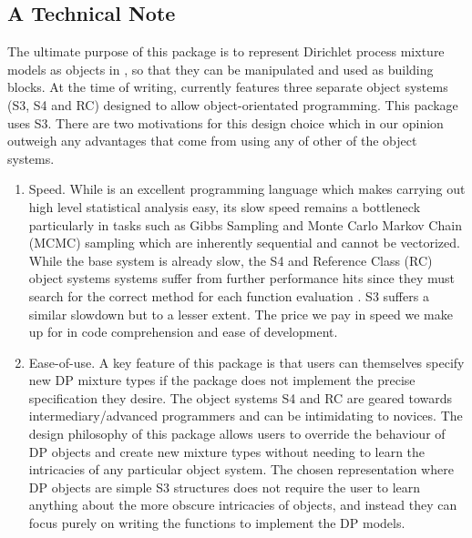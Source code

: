 \documentclass[nojss]{jss}
\begin{document}
\subsection{A Technical Note}
The ultimate purpose of this package is to represent Dirichlet process mixture models as objects in , so that they can be manipulated and used as building blocks. At the time of writing,  currently features three separate object systems (S3, S4 and RC) designed to allow object-orientated programming. This package uses S3. There are two motivations for this design choice which in our opinion outweigh any advantages that come from using any of other of the  object systems.

\begin{enumerate}
\item Speed. While  is an excellent programming language which makes carrying out high level statistical analysis easy, its slow speed remains a bottleneck particularly in tasks such as Gibbs Sampling and Monte Carlo Markov Chain (MCMC) sampling which are inherently sequential and cannot be vectorized. While the base  system is already slow, the S4 and Reference Class (RC) object systems systems suffer from further performance hits since they must search for the correct method for each function evaluation \citep{wickham_advanced_2014}. S3 suffers a similar slowdown but to a lesser extent. The price we pay in speed we make up for in code comprehension and ease of development.

\item Ease-of-use. A key feature of this package is that users can themselves specify new DP mixture types if the package does not implement the precise specification they desire.  The object systems S4 and RC are geared towards intermediary/advanced  programmers and can be intimidating to novices. The design philosophy of this package allows  users to override the behaviour of DP objects and create new mixture types without needing to learn the intricacies of any particular object system.  The chosen representation where DP objects are simple S3 structures does not require the user to learn anything about the more obscure intricacies of  objects, and instead they can focus purely on writing the  functions to implement the DP models.
\end{enumerate}
\end{document}
